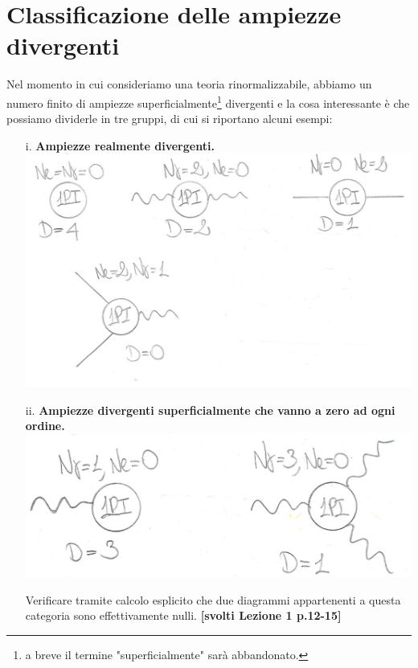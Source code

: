 \documentclass[../main.tex]{subfiles}
\begin{document}
\section{Classificazione delle ampiezze divergenti}
Nel momento in cui consideriamo una teoria rinormalizzabile, abbiamo un numero finito di ampiezze superficialmente\footnote{a breve il termine "superficialmente" sarà abbandonato.} divergenti e la cosa interessante è che possiamo dividerle in tre gruppi, di cui si riportano alcuni esempi: 
\begin{enumerate}
    \item[i.] \textbf{Ampiezze realmente divergenti.}\\                
                \includegraphics[]{images/Ampiezze_tipo1.jpg}
    \item[ii.] \textbf{Ampiezze divergenti superficialmente che vanno a zero ad ogni ordine.}\\
                \includegraphics[]{images/Ampiezze_tipo2.jpg}\\
                \begin{exercise}
                Verificare tramite calcolo esplicito che due diagrammi appartenenti a questa categoria sono effettivamente nulli. \textbf{[svolti Lezione 1 p.12-15]}
                \end{exercise}

\end{enumerate}
\end{document}
